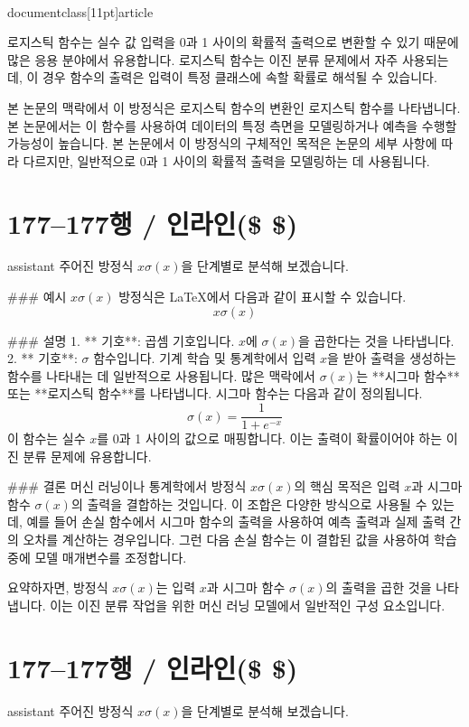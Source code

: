 \\documentclass[11pt]{article}
\begin{document}
로지스틱 함수는 실수 값 입력을 0과 1 사이의 확률적 출력으로 변환할 수 있기 때문에 많은 응용 분야에서 유용합니다. 로지스틱 함수는 이진 분류 문제에서 자주 사용되는데, 이 경우 함수의 출력은 입력이 특정 클래스에 속할 확률로 해석될 수 있습니다.

본 논문의 맥락에서 이 방정식은 로지스틱 함수의 변환인 로지스틱 함수를 나타냅니다. 본 논문에서는 이 함수를 사용하여 데이터의 특정 측면을 모델링하거나 예측을 수행할 가능성이 높습니다. 본 논문에서 이 방정식의 구체적인 목적은 논문의 세부 사항에 따라 다르지만, 일반적으로 0과 1 사이의 확률적 출력을 모델링하는 데 사용됩니다.

\section*{177–177행 / 인라인(\$ \$) }
assistant
주어진 방정식 \( x \sigma(x) \)을 단계별로 분석해 보겠습니다.

### 예시
\( x \sigma(x) \) 방정식은 LaTeX에서 다음과 같이 표시할 수 있습니다.
\[ x \sigma(x) \]

### 설명
1. ** 기호**: 곱셈 기호입니다. \( x \)에 \( \sigma(x) \)을 곱한다는 것을 나타냅니다.
2. ** 기호**: \( \sigma \) 함수입니다. 기계 학습 및 통계학에서 입력 \( x \)을 받아 출력을 생성하는 함수를 나타내는 데 일반적으로 사용됩니다. 많은 맥락에서 \( \sigma(x) \)는 **시그마 함수** 또는 **로지스틱 함수**를 나타냅니다. 시그마 함수는 다음과 같이 정의됩니다.
\[
   \sigma(x) = \frac{1}{1 + e^{-x}}
   \]
이 함수는 실수 \( x \)를 0과 1 사이의 값으로 매핑합니다. 이는 출력이 확률이어야 하는 이진 분류 문제에 유용합니다.

### 결론
머신 러닝이나 통계학에서 방정식 \( x \sigma(x) \)의 핵심 목적은 입력 \( x \)과 시그마 함수 \( \sigma(x) \)의 출력을 결합하는 것입니다. 이 조합은 다양한 방식으로 사용될 수 있는데, 예를 들어 손실 함수에서 시그마 함수의 출력을 사용하여 예측 출력과 실제 출력 간의 오차를 계산하는 경우입니다. 그런 다음 손실 함수는 이 결합된 값을 사용하여 학습 중에 모델 매개변수를 조정합니다.

요약하자면, 방정식 \( x \sigma(x) \)는 입력 \( x \)과 시그마 함수 \( \sigma(x) \)의 출력을 곱한 것을 나타냅니다. 이는 이진 분류 작업을 위한 머신 러닝 모델에서 일반적인 구성 요소입니다.


\section*{177–177행 / 인라인(\$ \$) }
assistant
주어진 방정식 \( x \sigma(x) \)을 단계별로 분석해 보겠습니다.
\end{document}

